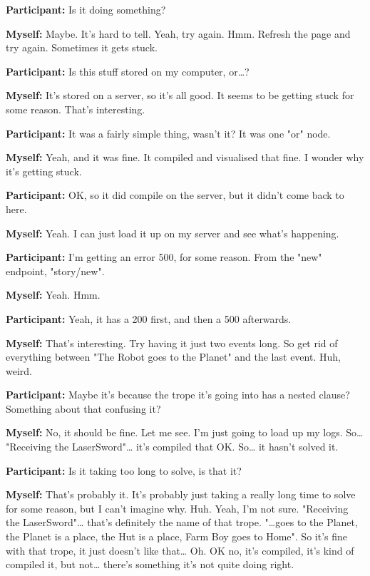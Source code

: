 \documentclass[11pt]{report}
\begin{document}
\begin{linenumbers}
\textbf{Participant:} Is it doing something?

\textbf{Myself:} Maybe. It's hard to tell. Yeah, try again. Hmm. Refresh the page and try again. Sometimes it gets stuck.

\textbf{Participant:} Is this stuff stored on my computer, or\ldots{}?

\textbf{Myself:} It's stored on a server, so it's all good. It seems to be getting stuck for some reason. That's interesting.

\textbf{Participant:} It was a fairly simple thing, wasn't it? It was one "or" node.

\textbf{Myself:} Yeah, and it was fine. It compiled and visualised that fine. I wonder why it's getting stuck.

\textbf{Participant:} OK, so it did compile on the server, but it didn't come back to here.

\textbf{Myself:} Yeah. I can just load it up on my server and see what's happening.

\textbf{Participant:} I'm getting an error 500, for some reason. From the "new" endpoint, "story/new".

\textbf{Myself:} Yeah. Hmm.

\textbf{Participant:} Yeah, it has a 200 first, and then a 500 afterwards.

\textbf{Myself:} That's interesting. Try having it just two events long. So get rid of everything between "The Robot goes to the Planet" and the last event. Huh, weird.

\textbf{Participant:} Maybe it's because the trope it's going into has a nested clause? Something about that confusing it?

\textbf{Myself:} No, it should be fine. Let me see. I'm just going to load up my logs. So\ldots{} "Receiving the LaserSword"\ldots{} it's compiled that OK. So\ldots{} it hasn't solved it.

\textbf{Participant:} Is it taking too long to solve, is that it?

\textbf{Myself:} That's probably it. It's probably just taking a really long time to solve for some reason, but I can't imagine why. Huh. Yeah, I'm not sure. "Receiving the LaserSword"\ldots{} that's definitely the name of that trope. "\ldots{}goes to the Planet, the Planet is a place, the Hut is a place, Farm Boy goes to Home". So it's fine with that trope, it just doesn't like that\ldots{} Oh. OK no, it's compiled, it's kind of compiled it, but not\ldots{} there's something it's not quite doing right.


\end{linenumbers}
\end{document}
